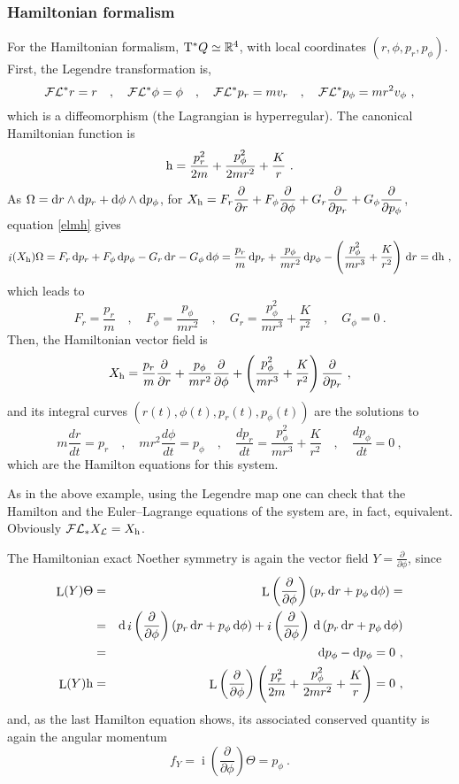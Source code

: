 \documentclass[12pt]{report}
\def\beann{\begin{eqnarray*}}
\def\eeann{\end{eqnarray*}}
\def\dst{\displaystyle}
\def\derpar#1#2{\frac{\partial{#1}}{\partial{#2}}}
\def\Lag{{\cal L}}
\def\d{{\rm d}}
\def\Real{\mathbb{R}}
\def\Tan{{\rm T}}
\def\Lie{\mathop{\rm L}\nolimits}
\def\inn{\mathop{i}\nolimits}
\def\Leg{{\cal F}\Lag}
\begin{document}
\subsubsection{Hamiltonian formalism}


For the Hamiltonian formalism, $\Tan^*Q\simeq\Real^4$,
with local coordinates $(r,\phi,p_r,p_\phi)$. First, the Legendre transformation is,
$$
\Leg^*r=r  \quad , \quad \Leg^*\phi=\phi  \quad , \quad
\Leg^*p_r=mv_r  \quad , \quad \Leg^*p_\phi=mr^2v_\phi\ ,
$$
which is a diffeomorphism (the Lagrangian is hyperregular).
The canonical Hamiltonian function is
$$
{\rm h}=\frac{p_r^2}{2m}+\frac{p_\phi^2}{2mr^2}+\frac{K}{r} \ .
$$
As $\Omega=\d r\wedge\d p_r+\d \phi\wedge\d p_\phi$,
for $\displaystyle X_{\rm h}=F_r\derpar{}{r}+F_\phi\derpar{}{\phi}+
G_r\derpar{}{p_r}+G_\phi\derpar{}{p_\phi}$,
equation \eqref{elmh} gives
$$
\inn(X_{\rm h})\Omega= 
F_r\, \d p_r+F_\phi\, \d p_\phi-G_r\, \d r-G_\phi\, \d \phi=
\frac{p_r}{m}\, \d p_r+\frac{p_\phi}{mr^2}\, \d p_\phi-
\left(\frac{p_\phi^2}{mr^3}+\frac{K}{r^2}\right)\, \d r=\d{\rm h}\ ,
$$
which leads to
$$
F_r=\frac{p_r}{m} \quad , \quad F_\phi=\frac{p_\phi}{mr^2} \quad , \quad
G_r=\frac{p_\phi^2}{mr^3}+\frac{K}{r^2} \quad , \quad G_\phi=0  \ .
$$
Then, the Hamiltonian vector field is
$$
X_{\rm h}=\frac{p_r}{m}\derpar{}{r}+\frac{p_\phi}{mr^2}\derpar{}{\phi}+\left(\frac{p_\phi^2}{mr^3}+\frac{K}{r^2}\right)\derpar{}{p_r} \ ,
$$
and its integral curves $(r(t),\phi(t),p_r(t),p_\phi(t))$ are the solutions to
$$
m\frac{dr}{dt} =p_r \quad , \quad mr^2\frac{d\phi}{dt} =p_\phi \quad , \quad
\frac{dp_r}{dt}=\frac{p_\phi^2}{mr^3}+\frac{K}{r^2} \quad , \quad
\frac{dp_\phi}{dt}=0 \ ,
$$
which are the Hamilton equations for this system.

As in the above example, using the Legendre map
one can check that the Hamilton and
the Euler--Lagrange equations of the system are, in fact, equivalent.
Obviously $\Leg_*X_\Lag=X_{\rm h}$.

The Hamiltonian exact Noether symmetry is again the
vector field $\dst Y=\derpar{}{\phi}$, since
\beann
\Lie(Y)\Theta&=& 
\Lie\left(\derpar{}{\phi}\right)\left(p_r\,\d r+p_\phi\,\d\phi\right) =\\ &=&
\d\inn\left(\derpar{}{\phi}\right)\left(p_r\,\d r+p_\phi\,\d\phi\right) +
\inn\left(\derpar{}{\phi}\right)\,\d\left(p_r\,\d r+p_\phi\,\d\phi\right)  \\ &=&
\d p_\phi-\d p_\phi=0 \ , 
\\
\Lie(Y){\rm h}&=& 
\Lie\left(\derpar{}{\phi}\right)\left(\frac{p_r^2}{2m}+\frac{p_\phi^2}{2mr^2}+\frac{K}{r}\right)=0 \ ,
\eeann
and, as the last Hamilton equation shows,
 its associated conserved quantity is again the angular momentum
$$
f_Y=\inn\left(\derpar{}{\phi}\right)\Theta=p_\phi \ .
$$
\end{document}
